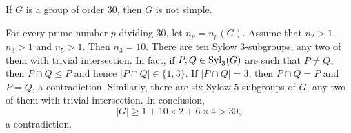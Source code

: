 \begin{example}
If $G$ is a group of order 30, then $G$ is not simple.

For every prime number $p$ dividing 30, let $n_p=n_p(G)$. Assume that
$n_2>1$, $n_3>1$ and $n_5>1$.
 Then $n_3=10$. There are ten 
Sylow $3$-subgroups, any two of them with trivial intersection. 
In fact, if $P,Q\in\mathrm{Syl}_3(G)$ are such that 
 $P\ne Q$, then $P\cap Q\leq P$ and hence 
$|P\cap Q|\in\{1,3\}$. If $|P\cap Q|=3$, then $P\cap Q=P$ and $P=Q$, a contradiction. Similarly, 
there are six Sylow $5$-subgroups of $G$, any two of them with 
trivial intersection. In conclusion,
\[
|G|\geq 1+10\times 2+6\times 4>30,
\]
a contradiction.
\end{example}


